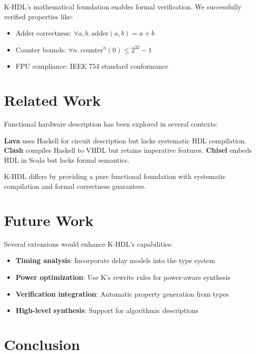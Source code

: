 \documentclass[10pt,twocolumn]{article}
\begin{document}
K-HDL's mathematical foundation enables formal verification. We successfully verified properties like:

\begin{itemize}
\item Adder correctness: $\forall a,b.\ \text{adder}(a,b) = a + b$
\item Counter bounds: $\forall n.\ \text{counter}^n(0) \leq 2^{32}-1$
\item FPU compliance: IEEE 754 standard conformance
\end{itemize}

\section{Related Work}

Functional hardware description has been explored in several contexts:

\textbf{Lava} \cite{bjesse1998lava} uses Haskell for circuit description but lacks systematic HDL compilation. \textbf{Clash} \cite{baaij2010clash} compiles Haskell to VHDL but retains imperative features. \textbf{Chisel} \cite{bachrach2012chisel} embeds HDL in Scala but lacks formal semantics.

K-HDL differs by providing a pure functional foundation with systematic compilation and formal correctness guarantees.

\section{Future Work}

Several extensions would enhance K-HDL's capabilities:

\begin{itemize}
\item \textbf{Timing analysis}: Incorporate delay models into the type system
\item \textbf{Power optimization}: Use K's rewrite rules for power-aware synthesis
\item \textbf{Verification integration}: Automatic property generation from types
\item \textbf{High-level synthesis}: Support for algorithmic descriptions
\end{itemize}

\section{Conclusion}
\end{document}
